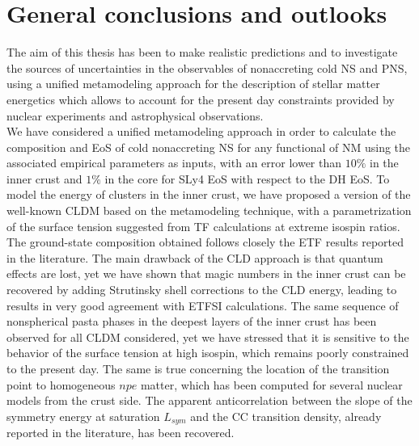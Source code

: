 \chapter*{General conclusions and outlooks}

The aim of this thesis has been to make realistic predictions and to 
investigate the sources of uncertainties in the observables of nonaccreting 
cold NS and PNS, using a unified metamodeling 
approach for the description of stellar matter energetics which allows to 
account for the present day constraints provided by nuclear experiments and 
astrophysical observations.
\\

We have considered a unified metamodeling approach in order to 
calculate the composition and EoS of cold nonaccreting NS for any 
functional of NM using the associated empirical parameters as inputs, with an 
error lower than $10\%$ in the inner crust and $1\%$ in the core for SLy4 EoS 
with respect to the DH EoS. 
To model the energy of clusters in the inner crust, we have proposed a version 
of the well-known CLDM based on the metamodeling technique, with a
parametrization of the surface tension suggested from TF calculations at 
extreme isospin ratios. The ground-state composition obtained follows closely 
the ETF results reported in the literature. The main drawback of the 
CLD approach is that quantum effects are lost, yet we have shown that magic 
numbers in the inner crust can be recovered by adding Strutinsky shell 
corrections to the CLD energy, leading to results in very good agreement with 
ETFSI calculations. 
The same sequence of nonspherical pasta phases in the deepest layers of the 
inner crust has been observed for all CLDM considered, yet we have stressed 
that it is sensitive to the behavior of the surface tension at high isospin,
which remains poorly constrained to the present day.
The same is true concerning the location of the transition point to 
homogeneous $npe$ matter, which has been computed for several nuclear models
from the crust side. The apparent anticorrelation between the slope of the
symmetry energy at saturation $L_{sym}$ and the CC transition density, already
reported in the literature, has been recovered.

